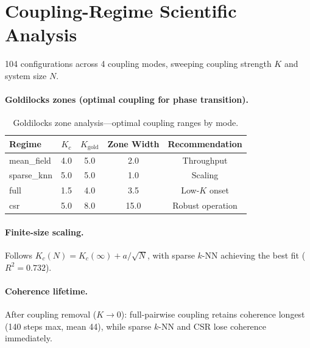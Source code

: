 \documentclass[11pt]{article}
\begin{document}
\section{Coupling-Regime Scientific Analysis}
\label{app:coupling_regime}

104 configurations across 4 coupling modes, sweeping coupling
strength $K$ and system size $N$.

\paragraph{Goldilocks zones (optimal coupling for phase transition).}

\begin{table}[htbp]
\centering
\caption{Goldilocks zone analysis---optimal coupling ranges by mode.}
\label{tab:goldilocks}
\begin{tabular}{lcccc}
\toprule
Regime & $K_c$ & $K_\text{gold}$ & Zone Width & Recommendation \\
\midrule
mean\_field & 4.0 & 5.0 & 2.0 & Throughput \\
sparse\_knn & 5.0 & 5.0 & 1.0 & Scaling \\
full        & 1.5 & 4.0 & 3.5 & Low-$K$ onset \\
csr         & 5.0 & 8.0 & 15.0 & Robust operation \\
\bottomrule
\end{tabular}
\end{table}

\paragraph{Finite-size scaling.}
Follows $K_c(N) = K_c(\infty) + a / \sqrt{N}$, with sparse $k$-NN
achieving the best fit ($R^2 = 0.732$).

\paragraph{Coherence lifetime.}
After coupling removal ($K \to 0$): full-pairwise coupling retains
coherence longest (140 steps max, mean 44), while sparse $k$-NN and
CSR lose coherence immediately.

\end{document}
